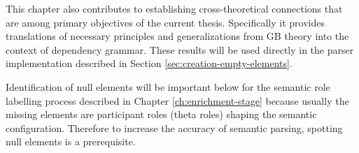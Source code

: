 This chapter also contributes to establishing cross-theoretical connections that are among primary objectives of the current thesis. Specifically it provides translations of necessary principles and generalizations from GB theory into the context of dependency grammar. These results will be used directly in the parser implementation described in Section \ref{sec:creation-empty-elements}.

Identification of null elements will be important below for the semantic role labelling process described in Chapter \ref{ch:enrichment-stage} because usually the missing elements are participant roles (theta roles) shaping the semantic configuration. Therefore to increase the accuracy of semantic parsing, spotting null elements is a prerequisite.